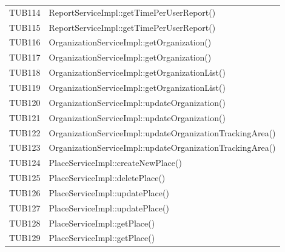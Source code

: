 {\begin{longtable}{C{2cm} C{8cm}}
		TUB114 & ReportServiceImpl::getTimePerUserReport()\\
		TUB115 & ReportServiceImpl::getTimePerUserReport()\\
		TUB116 & OrganizationServiceImpl::getOrganization()\\
		TUB117 & OrganizationServiceImpl::getOrganization()\\
		TUB118 & OrganizationServiceImpl::getOrganizationList()\\
		TUB119 & OrganizationServiceImpl::getOrganizationList()\\
		TUB120 & OrganizationServiceImpl::updateOrganization()\\
		TUB121 & OrganizationServiceImpl::updateOrganization()\\
		TUB122 & OrganizationServiceImpl::updateOrganizationTrackingArea()\\
		TUB123 & OrganizationServiceImpl::updateOrganizationTrackingArea()\\
		TUB124 & PlaceServiceImpl::createNewPlace()\\
		TUB125 & PlaceServiceImpl::deletePlace()\\
		TUB126 & PlaceServiceImpl::updatePlace()\\
		TUB127 & PlaceServiceImpl::updatePlace()\\
		TUB128 & PlaceServiceImpl::getPlace()\\
		TUB129 & PlaceServiceImpl::getPlace()\\
		
	\end{longtable}
}
